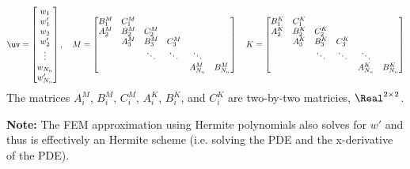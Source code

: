 \documentclass[11pt]{article}
\begin{document}
\begin{align}
   \uv = \begin{bmatrix} w_1 \\ w'_1 \\ w_2 \\ w'_2 \\ \vdots \\ w_{\Nn} \\ w'_{\Nn} \end{bmatrix} , 
\quad 
   M = \begin{bmatrix} 
          B^M_1 & C^M_1 &     &      &     &     \\ 
          A^M_2 & B^M_2 & C^M_2 &      &     &     \\
              & A^M_3 & B^M_3 & C^M_3  &     &     \\
              &     & \ddots & \ddots  & \ddots  & \\
              &     &     &     & A^M_{\Nn} & B^M_{\Nn}
           \end{bmatrix} 
\quad               
   K = \begin{bmatrix} 
          B^K_1 & C^K_1 &     &      &     &     \\ 
          A^K_2 & B^K_2 & C^K_2 &      &     &     \\
              & A^K_3 & B^K_3 & C^K_3  &     &     \\
              &     & \ddots & \ddots  & \ddots  & \\
              &     &     &     & A^K_{\Nn} & B^K_{\Nn}
           \end{bmatrix} 
\end{align}
The matrices $A^M_i$, $B^M_i$, $C^M_i$,  $A^K_i$, $B^K_i$, and $C^K_i$ are two-by-two matricies, $\Real^{2\times2}$.

{\bf Note:} The FEM approximation using Hermite polynomials also solves for $w'$ and thus is effectively
an Hermite scheme (i.e. solving the PDE and the x-derivative of the PDE).

\end{document}
